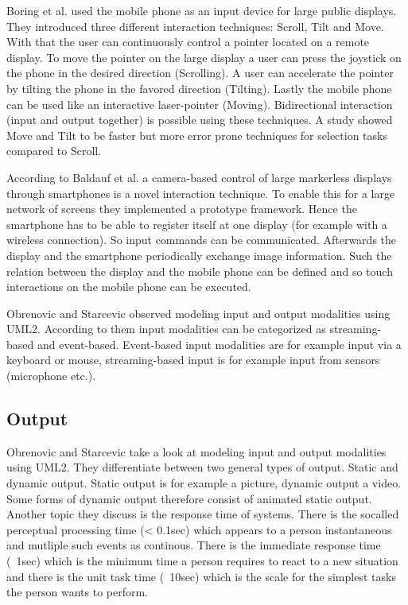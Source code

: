 Boring et al. \cite{p161-boring} used the mobile phone as an input device for large public displays.
They introduced three different interaction techniques: Scroll, Tilt and Move. With that the user can continuously control a pointer located on a remote display.
To move the pointer on the large display a user can press the joystick on the phone in the desired direction (Scrolling).
A user can accelerate the pointer by tilting the phone in the favored direction (Tilting).
Lastly the mobile phone can be used like an interactive laser-pointer (Moving).
Bidirectional interaction (input and output together) is possible using these techniques.
A study showed Move and Tilt to be faster but more error prone techniques for selection tasks compared to Scroll.

According to Baldauf et al. \cite{a4-baldauf} a camera-based control of large markerless displays through smartphones is a novel interaction technique.
To enable this for a large network of screens they implemented a prototype framework.
Hence the smartphone has to be able to register itself at one display (for example with a wireless connection).
So input commands can be communicated.
Afterwards the display and the smartphone periodically exchange image information.
Such the relation between the display and the mobile phone can be defined and so touch interactions on the mobile phone can be executed.

Obrenovic and Starcevic \cite{obrenovic_modeling_2004} observed modeling input and output modalities using UML2.
According to them input modalities can be categorized as streaming-based and event-based.
Event-based input modalities are for example input via a keyboard or mouse, streaming-based input is for example input from sensors (microphone etc.).

\subsection{Output}
Obrenovic and Starcevic \cite{obrenovic_modeling_2004} take a look at modeling input and output modalities using UML2.
They differentiate between two general types of output. Static and dynamic output.
Static output is for example a picture, dynamic output a video.
Some forms of dynamic output therefore consist of animated static output.
Another topic they discuss is the response time of systems.
There is the socalled perceptual processing time (< 0.1sec) which appears to a person instantaneous and mutliple such events as continous.
There is the immediate response time (~1sec) which is the minimum time a person requires to react to a new situation and there is the unit task time (~10sec) which is the scale for the simplest tasks the person wants to perform.


